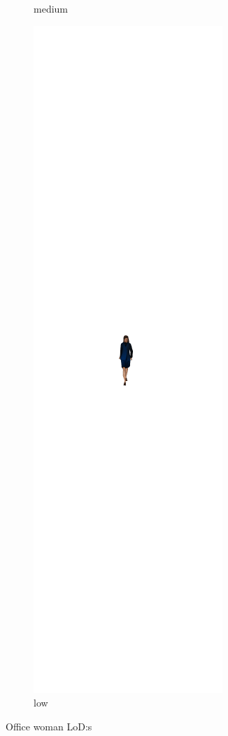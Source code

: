 \begin{figure}[h]
\begin{subfigure}[b]{.22\textwidth}
    \caption{medium}
    \label{fig:woman2}
  \end{subfigure}%
  \begin{subfigure}[b]{.22\textwidth}
    \includegraphics[width=\textwidth]{figures/woman/cropped/3.png}
    \caption{low}
    \label{fig:woman3}
  \end{subfigure}
  \caption{Office woman LoD:s}
  \label{fig:woman_lod}
\end{figure}


